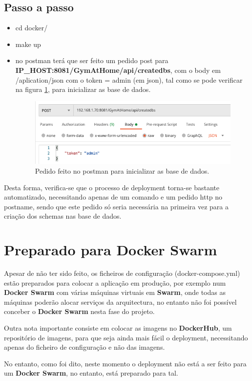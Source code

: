 \subsection{Passo a passo}
\begin{itemize}
    \item cd docker/
    \item make up
    \item no postman terá que ser feito um pedido post para \textbf{IP\_HOST:8081/GymAtHome/api/createdbs}, com o body em /aplication/json com o token = admin (em json), tal como se pode verificar na figura \ref{fig:postman}, para inicializar as base de dados.
    
    \begin{figure}[H]
        \centering
        \includegraphics[scale=0.45]{images/deployment/postman.png}
        \caption{Pedido feito no postman para inicializar as base de dados.}
        \label{fig:postman}
    \end{figure}
\end{itemize}

\hspace{5mm} Desta forma, verifica-se que o processo de deployment torna-se bastante automatizado, necessitando apenas de um comando e um pedido http no postname, sendo que este pedido só seria necessária na primeira vez para a criação dos schemas nas base de dados.

\section{Preparado para Docker Swarm}

\hspace{5mm} Apesar de não ter sido feito, os ficheiros de configuração (docker-compose.yml) estão preparados para colocar a aplicação em produção, por exemplo num \textbf{Docker Swarm} com várias máquinas virtuais em \textbf{Swarm}, onde todas as máquinas poderão alocar serviços da arquitectura, no entanto não foi possível conceber o \textbf{Docker Swarm} nesta fase do projeto. 

\hspace{5mm} Outra nota importante consiste em colocar as imagens no \textbf{DockerHub}, um repositório de imagens, para que seja ainda mais fácil o deployment, necessitando apenas do ficheiro de configuração e não das imagens.

\hspace{5mm} No entanto, como foi dito, neste momento o deployment não está a ser feito para um \textbf{Docker Swarm}, no entanto, está preparado para tal.